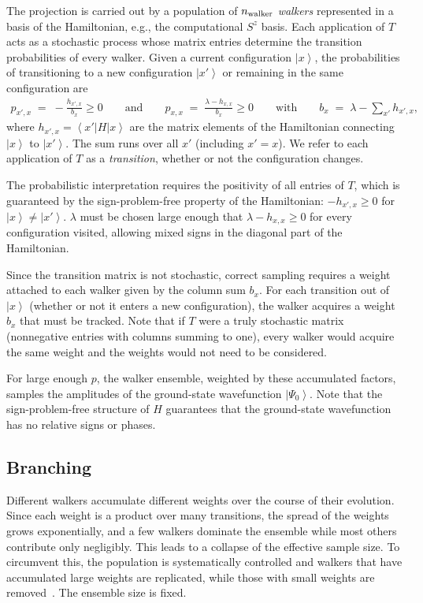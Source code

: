 \documentclass{SciPost}
\newcommand{\nwalker}{n_{\rm walker}}
\providecommand{\ket}[1]{\left|#1\right\rangle}
\providecommand{\bra}[1]{\left\langle#1\right|}
\begin{document}
The projection is carried out by a population of $\nwalker$ \textit{walkers} represented in a basis of the Hamiltonian, e.g., the computational $S^z$ basis.
%
Each application of $T$ acts as a stochastic process whose matrix entries determine the transition probabilities of every walker.
%
Given a current configuration $\ket{x}$, the probabilities of transitioning to a new configuration $\ket{x'}$ or remaining in the same configuration are
\begin{align}
	p_{x',x} \;=\; -\frac{h_{x',x}}{b_x}\geq 0
	\qquad\text{and}\qquad
	p_{x,x} \;=\; \frac{\lambda - h_{x,x}}{b_x}\geq 0
	\qquad\text{with}\qquad
	b_x \;=\; \lambda - \sum_{x'} h_{x',x},\label{eq:prob}
\end{align}
where $h_{x',x} = \bra{x'} H \ket{x}$ are the matrix elements of the Hamiltonian connecting $\ket{x}$ to $\ket{x'}$.
%
The sum runs over all $x'$ (including $x' = x$).
%
We refer to each application of $T$ as a \textit{transition}, whether or not the configuration changes.

The probabilistic interpretation requires the positivity of all entries of $T$, which is guaranteed by the sign-problem-free property of the Hamiltonian: $-h_{x',x} \geq 0$ for $\ket{x}\neq \ket{x'}$.
%
$\lambda$ must be chosen large enough that $\lambda - h_{x,x} \geq 0$ for every configuration visited, allowing mixed signs in the diagonal part of the Hamiltonian.

Since the transition matrix is not stochastic, correct sampling requires a weight attached to each walker given by the column sum $b_x$.
%
For each transition out of $\ket{x}$ (whether or not it enters a new configuration), the walker acquires a weight $b_x$ that must be tracked.
%
Note that if $T$ were a truly stochastic matrix (nonnegative entries with columns summing to one), every walker would acquire the same weight and the weights would not need to be considered.

For large enough $p$, the walker ensemble, weighted by these accumulated factors, samples the amplitudes of the ground-state wavefunction $\ket{\Psi_0}$.
%
Note that the sign-problem-free structure of $H$ guarantees that the ground-state wavefunction has no relative signs or phases.



\subsection{Branching}\label{sec:gfmc:branching}
Different walkers accumulate different weights over the course of their evolution.
%
Since each weight is a product over many transitions, the spread of the weights grows exponentially, and a few walkers dominate the ensemble while most others contribute only negligibly.
%
This leads to a collapse of the effective sample size.
%
To circumvent this, the population is systematically controlled and walkers that have accumulated large weights are replicated, while those with small weights are removed~\cite{ghanem_population_2021,chen_algorithm_2023}.
%
The ensemble size is fixed.
\end{document}
